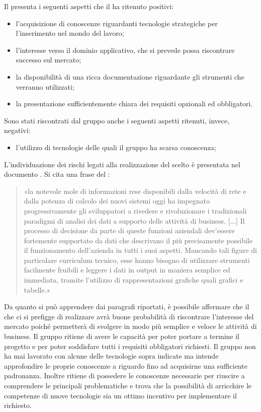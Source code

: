 		Il  presenta i seguenti aspetti che il  ha ritenuto positivi:
		\begin{itemize}
			\item l'acquisizione di conoscenze riguardanti tecnologie strategiche per l'inserimento nel mondo del lavoro;
			\item l'interesse verso il dominio applicativo, che si prevede possa riscontrare successo sul mercato;
			\item la disponibilità di una ricca documentazione riguardante gli strumenti che verranno utilizzati;
			\item la presentazione sufficientemente chiara dei requisiti opzionali ed obbligatori.
		\end{itemize}
		Sono stati riscontrati dal gruppo anche i seguenti aspetti ritenuti, invece, negativi:
		\begin{itemize}
			\item l'utilizzo di tecnologie delle quali il gruppo ha scarsa conoscenza;
		\end{itemize}
			L'individuazione dei rischi legati alla realizzazione del  scelto è presentata nel documento
			.
			Si cita una frase del :
			\begin{quotation}
				«la notevole mole di informazioni rese disponibili dalla velocità di rete e dalla potenza di calcolo dei nuovi sistemi oggi ha impegnato progressivamente gli sviluppatori a rivedere e rivoluzionare i tradizionali paradigmi di analisi dei dati a supporto delle attività di business. [...]
				Il processo di decisione da parte di queste funzioni aziendali dev’essere fortemente supportato da dati che descrivano il più precisamente possibile il funzionamento dell’azienda in tutti i suoi aspetti. Mancando tali figure di particolare curriculum tecnico, esse hanno bisogno di utilizzare strumenti facilmente fruibili e leggere i dati in output in maniera semplice ed immediata, tramite l’utilizzo di rappresentazioni grafiche quali grafici e tabelle.»
			\end{quotation}
			Da quanto si può apprendere dai paragrafi riportati, è possibile affermare che il  che ci si prefigge di realizzare avrà buone probabilità di riscontrare l'interesse del mercato poiché permetterà di svolgere in modo più semplice e veloce le attività di business.
		Il gruppo \groupname{} ritiene di avere le capacità per poter portare a termine il progetto e per poter soddisfare tutti i requisiti obbligatori richiesti. Il gruppo non ha mai lavorato con alcune delle tecnologie sopra indicate ma intende approfondire le proprie conoscenze a riguardo fino ad acquisirne una sufficiente padronanza. Inoltre ritiene di possedere le conoscenze necessarie per riuscire a comprendere le principali problematiche e trova che la possibilità di arricchire le competenze di nuove tecnologie sia un ottimo incentivo per implementare il  richiesto.

